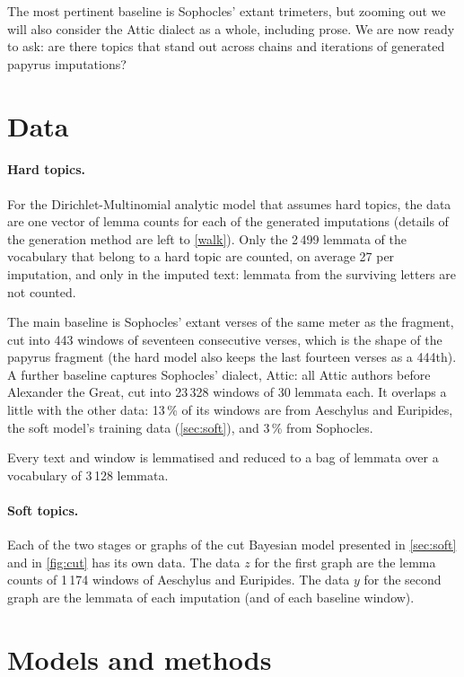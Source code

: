 \documentclass{article}
\theoremstyle{plain}
\theoremstyle{definition}
\theoremstyle{remark}
\begin{document}
The most pertinent baseline is Sophocles' extant trimeters, but zooming out we will also consider the Attic dialect as a whole, including prose. We are now ready to ask: are there topics that stand out across chains and iterations of generated papyrus imputations? 

\section{Data}
\label{sec:data}

\paragraph{Hard topics.}
For the Dirichlet-Multinomial analytic model that assumes hard topics, the data are one vector of lemma counts for each of the \imputations generated imputations (details of the generation method are left to \autoref{walk}). Only the 2\,499 lemmata of the vocabulary that belong to a hard topic are counted, on average 27 per imputation, and only in the imputed text: lemmata from the surviving letters are not counted.

The main baseline is Sophocles' extant verses of the same meter as the fragment, cut into 443 windows of seventeen consecutive verses, which is the shape of the papyrus fragment (the hard model also keeps the last fourteen verses as a 444th). A further baseline captures Sophocles' dialect, Attic: all Attic authors before Alexander the Great, cut into 23\,328 windows of 30 lemmata each. It overlaps a little with the other data: 13\,\% of its windows are from Aeschylus and Euripides, the soft model's training data (\autoref{sec:soft}), and 3\,\% from Sophocles.

Every text and window is lemmatised and reduced to a bag of lemmata over a vocabulary of 3\,128 lemmata.

\paragraph{Soft topics.}
Each of the two stages or graphs of the cut Bayesian model presented in \autoref{sec:soft} and in \autoref{fig:cut} has its own data. The data $z$ for the first graph are the lemma counts of 1\,174 windows of Aeschylus and Euripides. The data $y$ for the second graph are the lemmata of each imputation (and of each baseline window).

\section{Models and methods}
\label{sec:models}
\end{document}

